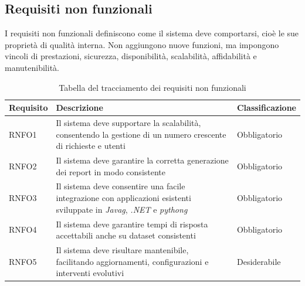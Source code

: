     \subsection{Requisiti non funzionali}
        I requisiti non funzionali definiscono come il sistema deve comportarsi, cioè le sue proprietà di qualità interna. Non aggiungono nuove funzioni, ma impongono vincoli di prestazioni, sicurezza, disponibilità, scalabilità, affidabilità e manutenibilità.\\
        \begin{table}[H]%
            \caption{Tabella del tracciamento dei requisiti non funzionali}
            \label{tab:requisiti-non-funzionali}
            \begin{tabularx}{\textwidth}{|lXl|}
            \hline\hline
            \rowcolor{gray!40}
            \textbf{Requisito} & \textbf{Descrizione} & \textbf{Classificazione}\\
            \hline
            RNFO1    & Il sistema deve supportare la scalabilità, consentendo la gestione di un numero crescente di richieste e utenti & Obbligatorio\\
            \hline
            RNFO2    & Il sistema deve garantire la corretta generazione dei report in modo consistente & Obbligatorio\\
            \hline
            RNFO3    & Il sistema deve consentire una facile integrazione con applicazioni esistenti sviluppate in \emph{\gls{Javag}}, \emph{.NET} e \emph{\gls{pythong}} & Obbligatorio\\
            \hline
            RNFO4    & Il sistema deve garantire tempi di risposta accettabili anche su dataset consistenti & Obbligatorio\\
            \hline
            RNFO5    & Il sistema deve risultare mantenibile, facilitando aggiornamenti, configurazioni e interventi evolutivi & Desiderabile\\
            \hline
            \end{tabularx}
        \end{table}%

